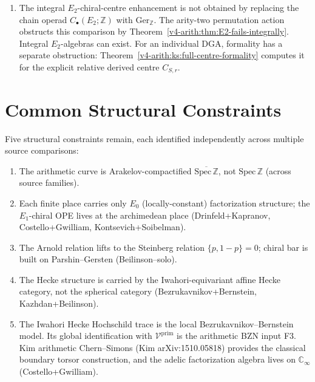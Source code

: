 \begin{enumerate}
\(\mathrm{Spec}\,\mathbb{Z}\) itself.
The moduli stack $\mathrm{Bun}_{GL_{2}}(\mathrm{Spec}\,\mathbb{Z})$
is \(BGL_{2}(\mathbb{Z})\): one coarse point with arithmetic
stabilizer. This stack has representation theory of the stabilizer,
not the geometric Hecke correspondence of the curve case.
\item The integral \(E_{2}\)-chiral-centre enhancement is not obtained
by replacing the chain operad \(C_{\bullet}(E_{2};\mathbb Z)\) with
\(\mathrm{Ger}_{\mathbb Z}\).
The arity-two permutation action obstructs this comparison by
Theorem~\ref{v4-arith:thm:E2-fails-integrally}.
Integral $E_2$-algebras can exist.
For an individual DGA, formality has a separate obstruction:
Theorem~\ref{v4-arith:ks:full-centre-formality} computes it for the
explicit relative derived centre $C_{S,r}$.
\end{enumerate}

\section{Common Structural Constraints}
\label{v4-arith:app:B:converged-structures}

Five structural constraints remain, each identified independently
across multiple source comparisons:

\begin{enumerate}
\item The arithmetic curve is Arakelov-compactified
\(\overline{\mathrm{Spec}\,\mathbb{Z}}\), not \(\mathrm{Spec}\,\mathbb{Z}\)
(across source families).
\item Each finite place carries only \(E_{0}\) (locally-constant)
factorization structure; the \(E_{1}\)-chiral OPE lives at the
archimedean place (Drinfeld+Kapranov, Costello+Gwilliam,
Kontsevich+Soibelman).
\item The Arnold relation lifts to the Steinberg relation
\(\{p,1-p\}=0\); chiral bar is built on Parshin--Gersten
(Beilinson--solo).
\item The Hecke structure is carried by the Iwahori-equivariant
affine Hecke category, not the spherical category
(Bezrukavnikov+Bernstein, Kazhdan+Beilinson).
\item The Iwahori Hecke Hochschild trace is the local
Bezrukavnikov--Bernstein model. Its global identification with
\(\mathcal{V}^{\mathrm{prim}}\) is the arithmetic BZN input F3. Kim
arithmetic Chern--Simons (Kim arXiv:1510.05818) provides the classical
boundary torsor construction, and the adelic factorization algebra
lives on \(\mathbb{C}_{\infty}\) (Costello+Gwilliam).
\end{enumerate}

